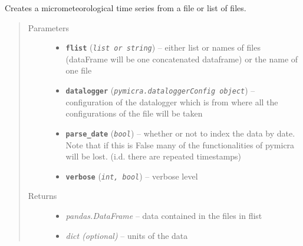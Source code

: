 \documentclass[a4paper,10pt,oneside]{sphinxmanual}
\begin{document}
\begin{fulllineitems}
\label{pymicra:pymicra.io.timeSeries}
Creates a micrometeorological time series from a file or list of files.
\begin{quote}\begin{description}
\item[{Parameters}] \leavevmode\begin{itemize}
\item {} 
\textbf{\texttt{flist}} (\emph{\texttt{list or string}}) -- either list or names of files (dataFrame will be one concatenated dataframe) or the name of one file

\item {} 
\textbf{\texttt{datalogger}} (\emph{\texttt{pymicra.dataloggerConfig object}}) -- configuration of the datalogger which is from where all the configurations of the file will be taken

\item {} 
\textbf{\texttt{parse\_date}} (\emph{\texttt{bool}}) -- whether or not to index the data by date. Note that if this is False many of the functionalities
of pymicra will be lost.
(i.d. there are repeated timestamps)

\item {} 
\textbf{\texttt{verbose}} (\emph{\texttt{int, bool}}) -- verbose level

\end{itemize}

\item[{Returns}] \leavevmode
\begin{itemize}
\item {} 
\emph{pandas.DataFrame} -- data contained in the files in flist

\item {} 
\emph{dict (optional)} -- units of the data

\end{itemize}


\end{description}\end{quote}

\end{fulllineitems}
\end{document}
